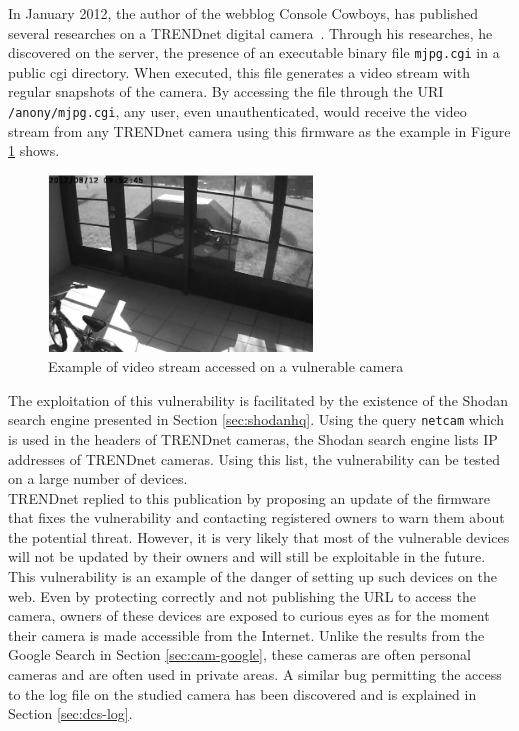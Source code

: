 In January 2012, the author of the webblog Console Cowboys, has published several researches on a TRENDnet digital camera~\cite{trendnet-hack}.
Through his researches, he discovered on the server, the presence of an executable binary file \texttt{mjpg.cgi} in a public cgi directory.
When executed, this file generates a video stream with regular snapshots of the camera.
By accessing the file through the URI \texttt{/anony/mjpg.cgi}, any user, even unauthenticated, would receive the video stream from any TRENDnet camera using this firmware as the example in Figure \ref{fig:trendnet-hack} shows.\\

\begin{figure}[h]
  \centering
  \includegraphics[width=7cm]{images/trendnet-hack2.png}
  \caption{Example of video stream accessed on a vulnerable camera}
  \label{fig:trendnet-hack}
\end{figure}

The exploitation of this vulnerability is facilitated by the existence of the Shodan search engine presented in Section \ref{sec:shodanhq}.
Using the query \texttt{netcam} which is used in the headers of TRENDnet cameras, the Shodan search engine lists IP addresses of TRENDnet cameras.
Using this list, the vulnerability can be tested on a large number of devices.\\

TRENDnet replied to this publication by proposing an update of the firmware that fixes the vulnerability and contacting registered owners to warn them about the potential threat.
However, it is very likely that most of the vulnerable devices will not be updated by their owners and will still be exploitable in the future.\\

This vulnerability is an example of the danger of setting up such devices on the web.
Even by protecting correctly and not publishing the URL to access the camera, owners of these devices are exposed to curious eyes as for the moment their camera is made accessible from the Internet.
Unlike the results from the Google Search in Section \ref{sec:cam-google}, these cameras are often personal cameras and are often used in private areas.
A similar bug permitting the access to the log file on the studied camera has been discovered and is explained in Section \ref{sec:dcs-log}.
